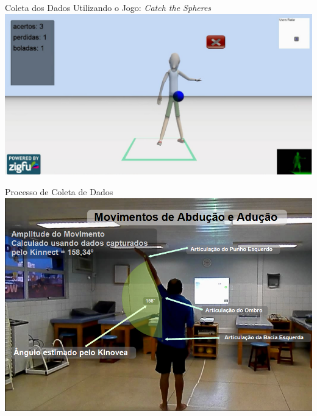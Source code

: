 \documentclass{beamer}
\begin{document}
\begin{frame}{Coleta dos Dados Utilizando o Jogo: \textit{Catch the Spheres}}
      \center \includegraphics[height=2.2 in]{img/catch-the-spheres.png}
\end{frame}

% 



\begin{frame}{Processo de Coleta de Dados}
      \center \includegraphics[height=2.6 in]{img/capturaducaokinnect.png}
\end{frame}
\end{document}
